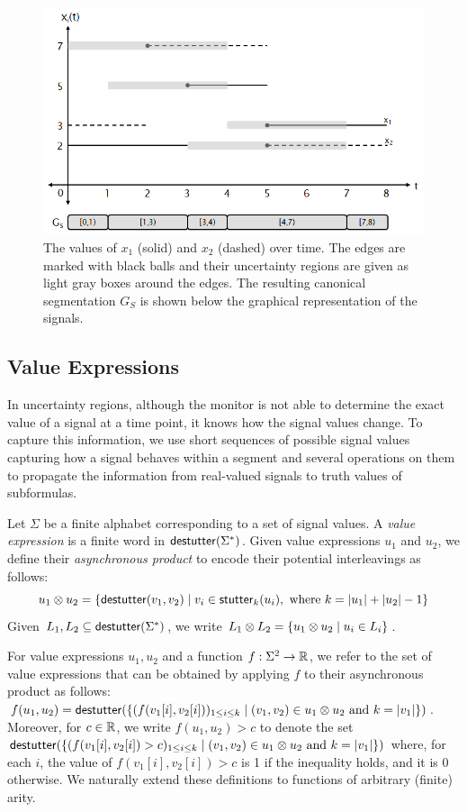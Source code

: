 \begin{figure} 
	\centering
	\includegraphics[scale=0.45]{canonseg.png}
	\caption{The values of $x_1$ (solid) and $x_2$ (dashed) over time. The edges are marked with black balls and their uncertainty regions are given as light gray boxes around the edges. The resulting canonical segmentation $G_S$ is shown below the graphical representation of the signals.\label{fig:canonseg}}
\end{figure}



\subsection{Value Expressions}
In uncertainty regions, although the monitor is not able to determine the exact value of a signal at a time point, it knows how the signal values change.
To capture this information, we use short sequences of possible signal values capturing how a signal behaves within a segment and several operations on them to propagate the information from real-valued signals to truth values of subformulas.

Let $\Sigma$ be a finite alphabet corresponding to a set of signal values.
A \emph{value expression} is a finite word in $\mathsf{destutter}(\Sigma^*)$.
Given value expressions $u_1$ and $u_2$, we define their \emph{asynchronous product} to encode their potential interleavings as follows:
\small
$$u_1 \otimes u_2 = \{ \destutter(v_1, v_2) \st v_i \in \stutter_k(u_i), \text{ where } k = |u_1| + |u_2| - 1\}$$  
\normalsize
Given $L_1, L_2 \subseteq \mathsf{destutter}(\Sigma^*)$, we write $L_1 \otimes L_2 = \{ u_1 \otimes u_2 \st u_i \in L_i\}$.

For value expressions $u_1, u_2$ and a function $f : \Sigma^2 \to \mathbb{R}$, we refer to the set of value expressions that can be obtained by applying $f$ to their asynchronous product as follows: $f(u_1, u_2) = \destutter(\{(f(v_1[i], v_2[i]))_{1 \leq i \leq k} \st (v_1, v_2) \in u_1 \otimes u_2 \text{ and } k = |v_1| \})$.
Moreover, for $c \in \mathbb{R}$, we write $f(u_1, u_2) > c$ to denote the set $\destutter(\{(f(v_1[i], v_2[i]) > c)_{1 \leq i \leq k} \st (v_1, v_2) \in u_1 \otimes u_2 \text{ and } k = |v_1|\})$ where, for each $i$, the value of $f(v_1[i], v_2[i]) > c$ is 1 if the inequality holds, and it is 0 otherwise.
We naturally extend these definitions to functions of arbitrary (finite) arity.

